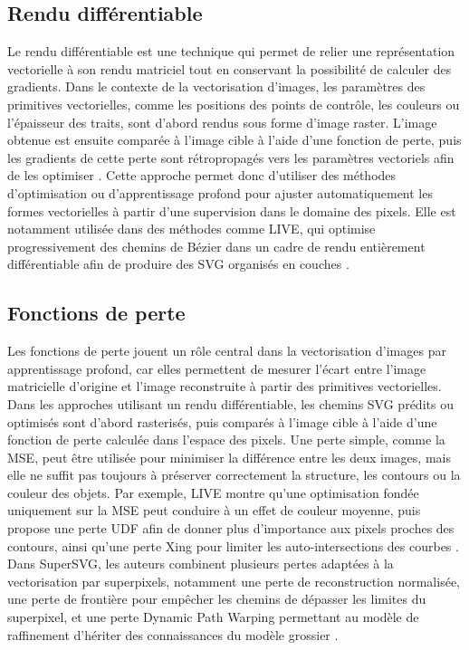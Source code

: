 \documentclass[12pt, a4paper, oneside]{report}
\begin{document}
    \subsection{Rendu différentiable}
    \label{sec:rendu_differentiel}
	Le rendu différentiable est une technique qui permet de relier une représentation vectorielle à son rendu matriciel tout en conservant la possibilité de calculer des gradients. Dans le contexte de la vectorisation d'images, les paramètres des primitives vectorielles, comme les positions des points de contrôle, les couleurs ou l'épaisseur des traits, sont d'abord rendus sous forme d'image raster. L'image obtenue est ensuite comparée à l'image cible à l'aide d'une fonction de perte, puis les gradients de cette perte sont rétropropagés vers les paramètres vectoriels afin de les optimiser \cite{li2020diffvg}. Cette approche permet donc d'utiliser des méthodes d'optimisation ou d'apprentissage profond pour ajuster automatiquement les formes vectorielles à partir d'une supervision dans le domaine des pixels. Elle est notamment utilisée dans des méthodes comme LIVE, qui optimise progressivement des chemins de Bézier dans un cadre de rendu entièrement différentiable afin de produire des SVG organisés en couches \cite{ma2022live}.
    \subsection{Fonctions de perte}
    \label{sec:fonctions_perte_vectorisation}
	Les fonctions de perte jouent un rôle central dans la vectorisation d'images par apprentissage profond, car elles permettent de mesurer l'écart entre l'image matricielle d'origine et l'image reconstruite à partir des primitives vectorielles. Dans les approches utilisant un rendu différentiable, les chemins SVG prédits ou optimisés sont d'abord rasterisés, puis comparés à l'image cible à l'aide d'une fonction de perte calculée dans l'espace des pixels. Une perte simple, comme la MSE, peut être utilisée pour minimiser la différence entre les deux images, mais elle ne suffit pas toujours à préserver correctement la structure, les contours ou la couleur des objets. Par exemple, LIVE montre qu'une optimisation fondée uniquement sur la MSE peut conduire à un effet de couleur moyenne, puis propose une perte UDF afin de donner plus d'importance aux pixels proches des contours, ainsi qu'une perte Xing pour limiter les auto-intersections des courbes \cite{ma2022live}. Dans SuperSVG, les auteurs combinent plusieurs pertes adaptées à la vectorisation par superpixels, notamment une perte de reconstruction normalisée, une perte de frontière pour empêcher les chemins de dépasser les limites du superpixel, et une perte Dynamic Path Warping permettant au modèle de raffinement d'hériter des connaissances du modèle grossier \cite{hu2024supersvg}.
\end{document}
